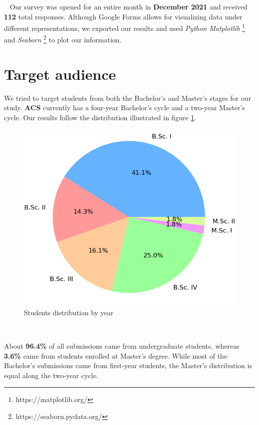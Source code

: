 ~
Our survey was opened for an entire month in \textbf{December 2021} and received \textbf{112} total responses. Although Google Forms allows for visualizing data under different representations, we exported our results and used \textit{Python Matplotlib} \footnote{https://matplotlib.org/} and \textit{Seaborn} \footnote{https://seaborn.pydata.org/} to plot our information.

\section{Target audience} \label{3:audience}

We tried to target students from both the Bachelor's and Master's stages for our study. \textbf{ACS} currently has a four-year Bachelor's cycle and a two-year Master's cycle. Our results follow the distribution illustrated in figure \ref{3:fig:students_year_piechart}.

\begin{figure}[ht]
    \centering
         \includegraphics[height=0.35\textheight]{figures/charts/survey/survey-students-year-piechart.png}
    \caption{Students distribution by year}
    \label{3:fig:students_year_piechart}
\end{figure}

~

About \textbf{96.4\%} of all submissions came from undergraduate students, whereas \textbf{3.6\%} came from students enrolled at Master's degree. While most of the Bachelor's submissions came from first-year students, the Master's distribution is equal along the two-year cycle.

